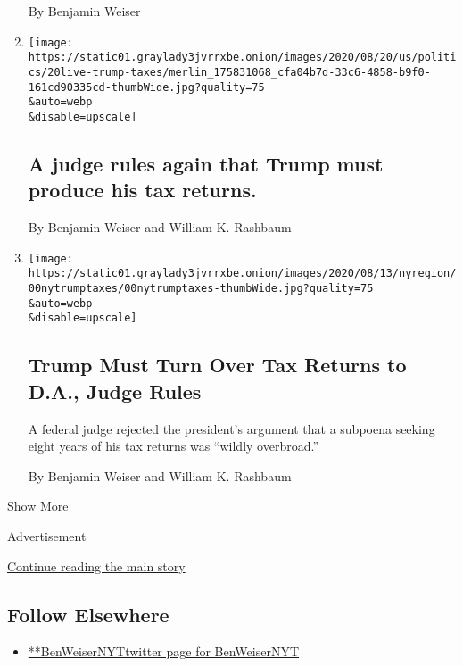 \begin{enumerate}
  By Benjamin Weiser
\item
  \href{/2020/08/20/us/elections/a-judge-rules-again-that-trump-must-produce-his-tax-returns.html}{}

  \texttt{[image: https://static01.graylady3jvrrxbe.onion/images/2020/08/20/us/politics/20live-trump-taxes/merlin\_175831068\_cfa04b7d-33c6-4858-b9f0-161cd90335cd-thumbWide.jpg?quality=75\\\&auto=webp\\\&disable=upscale]}

  \hypertarget{a-judge-rules-again-that-trump-must-produce-his-tax-returns}{%
  \subsection{A judge rules again that Trump must produce his tax
  returns.}\label{a-judge-rules-again-that-trump-must-produce-his-tax-returns}}

  By Benjamin Weiser and William K. Rashbaum
\item
  \href{/2020/08/20/nyregion/donald-trump-taxes-cyrus-vance.html}{}

  \texttt{[image: https://static01.graylady3jvrrxbe.onion/images/2020/08/13/nyregion/00nytrumptaxes/00nytrumptaxes-thumbWide.jpg?quality=75\\\&auto=webp\\\&disable=upscale]}

  \hypertarget{trump-must-turn-over-tax-returns-to-da-judge-rules}{%
  \subsection{Trump Must Turn Over Tax Returns to D.A., Judge
  Rules}\label{trump-must-turn-over-tax-returns-to-da-judge-rules}}

  A federal judge rejected the president's argument that a subpoena
  seeking eight years of his tax returns was ``wildly overbroad.''

  By Benjamin Weiser and William K. Rashbaum
\end{enumerate}

Show More

Advertisement

\protect\hyperlink{after-mid2}{Continue reading the main story}

\hypertarget{follow-elsewhere}{%
\subsection{Follow Elsewhere}\label{follow-elsewhere}}

\begin{itemize}
\tightlist
\item
  \href{https://twitter.com/BenWeiserNYT}{**BenWeiserNYTtwitter page for
  BenWeiserNYT}
\end{itemize}

